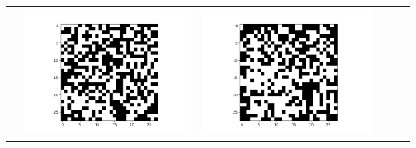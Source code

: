 \documentclass[12pt]{report}
\begin{document}
\begin{table}[H]
\begin{tabular}{  c  c  c  c  c  c }
\begin{minipage}{.15\textwidth}
    \end{minipage} & 
    \begin{minipage}{.15\textwidth}
      \includegraphics[scale=0.2]{BM_b1.png}
    \end{minipage} &
    \begin{minipage}{.15\textwidth}
      \includegraphics[scale=0.2]{BM_b2.png}
    \end{minipage} &
    \begin{minipage}{.15\textwidth}

\end{minipage}
\end{tabular}
\end{table}
\end{document}
